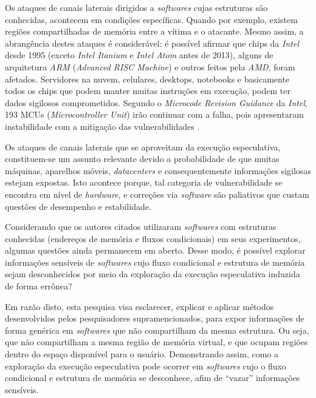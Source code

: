\documentclass[
	article,			    %
	12pt,				    %
	oneside,			    %
	a4paper,			    %
	chapter=TITLE,		    %
	section=TITLE,		    %
	subsection=TITLE,	    %
	english,			    %
	brazil,				    %
	sumario=tradicional
]{abntex2}
\begin{document}
Os ataques de canais laterais dirigidos a \emph{softwares} cujas estruturas são conhecidas, acontecem em condições específicas. Quando por exemplo, existem regiões compartilhadas de memória entre a vítima e o atacante. Mesmo assim, a abrangência destes ataques é considerável: é possível afirmar que chips da \emph{Intel} desde 1995 (exceto \emph{Intel Itanium} e \emph{Intel Atom} antes de 2013), alguns de arquitetura \emph{ARM} (\emph{Advanced RISC Machine}) e outros feitos pela \emph{AMD}, foram afetados. Servidores na nuvem, celulares, desktops, notebooks e basicamente todos os chips que podem manter muitas instruções em execução, podem ter dados sigilosos comprometidos. Segundo o \emph{Microcode Revision Guidance} da \emph{Intel}, 193 MCUs (\emph{Microcontroller Unit}) irão continuar com a falha, pois apresentaram instabilidade com a mitigação das vulnerabilidades \cite{intel-mug}.

Os ataques de canais laterais que se aproveitam da execução especulativa, constituem-se um assunto relevante devido a probabilidade de que muitas máquinas, aparelhos móveis, \emph{datacenters} e consequentemente informações sigilosas estejam expostas. Isto acontece porque, tal categoria de vulnerabilidade se encontra em nível de \emph{hardware}, e correções via \emph{software} são paliativos que custam questões de desempenho e estabilidade. 

Considerando que os autores citados utilizaram \emph{softwares} com estruturas conhecidas (endereços de memória e fluxos condicionais) em seus experimentos, algumas questões ainda permanecem em aberto. Desse modo, é possível explorar informações sensíveis de \emph{softwares} cujo fluxo condicional e estrutura de memória sejam desconhecidos por meio da exploração da execução especulativa induzida de forma errônea?

Em razão disto, esta pesquisa visa esclarecer, explicar e aplicar métodos desenvolvidos pelos pesquisadores supramencionados, para expor informações de forma genérica em \emph{softwares} que não compartilham da mesma estrutura. Ou seja, que não compartilham a mesma região de memória virtual, e que ocupam regiões dentro do espaço disponível para o usuário. Demonstrando assim, como a exploração da execução especulativa pode ocorrer em \emph{softwares} cujo o fluxo condicional e estrutura de memória se desconhece, afim de ``vazar'' informações sensíveis.
\end{document}
